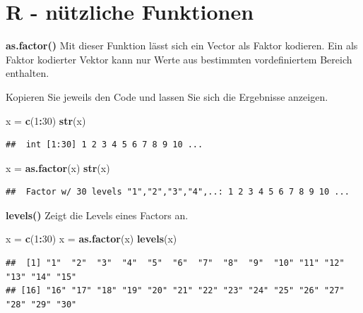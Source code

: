 \documentclass[]{book}
\newenvironment{Shaded}{\begin{snugshade}}{\end{snugshade}}
\newcommand{\KeywordTok}[1]{\textcolor[rgb]{0.13,0.29,0.53}{\textbf{#1}}}
\newcommand{\DecValTok}[1]{\textcolor[rgb]{0.00,0.00,0.81}{#1}}
\newcommand{\StringTok}[1]{\textcolor[rgb]{0.31,0.60,0.02}{#1}}
\newcommand{\OperatorTok}[1]{\textcolor[rgb]{0.81,0.36,0.00}{\textbf{#1}}}
\newcommand{\NormalTok}[1]{#1}
\begin{document}
\section{R - nützliche Funktionen}\label{r---nuxfctzliche-funktionen}

\textbf{as.factor()} Mit dieser Funktion lässt sich ein Vector als
Faktor kodieren. Ein als Faktor kodierter Vektor kann nur Werte aus
bestimmten vordefiniertem Bereich enthalten.

Kopieren Sie jeweils den Code und lassen Sie sich die Ergebnisse
anzeigen.

\begin{Shaded}
\begin{Highlighting}[]
\NormalTok{x =}\StringTok{ }\KeywordTok{c}\NormalTok{(}\DecValTok{1}\OperatorTok{:}\DecValTok{30}\NormalTok{)}
\KeywordTok{str}\NormalTok{(x)}
\end{Highlighting}
\end{Shaded}

\begin{verbatim}
##  int [1:30] 1 2 3 4 5 6 7 8 9 10 ...
\end{verbatim}

\begin{Shaded}
\begin{Highlighting}[]
\NormalTok{x =}\StringTok{ }\KeywordTok{as.factor}\NormalTok{(x)}
\KeywordTok{str}\NormalTok{(x)}
\end{Highlighting}
\end{Shaded}

\begin{verbatim}
##  Factor w/ 30 levels "1","2","3","4",..: 1 2 3 4 5 6 7 8 9 10 ...
\end{verbatim}

\textbf{levels()} Zeigt die Levels eines Factors an.

\begin{Shaded}
\begin{Highlighting}[]
\NormalTok{x =}\StringTok{ }\KeywordTok{c}\NormalTok{(}\DecValTok{1}\OperatorTok{:}\DecValTok{30}\NormalTok{)}
\NormalTok{x =}\StringTok{ }\KeywordTok{as.factor}\NormalTok{(x)}
\KeywordTok{levels}\NormalTok{(x)}
\end{Highlighting}
\end{Shaded}

\begin{verbatim}
##  [1] "1"  "2"  "3"  "4"  "5"  "6"  "7"  "8"  "9"  "10" "11" "12" "13" "14" "15"
## [16] "16" "17" "18" "19" "20" "21" "22" "23" "24" "25" "26" "27" "28" "29" "30"
\end{verbatim}
\end{document}
